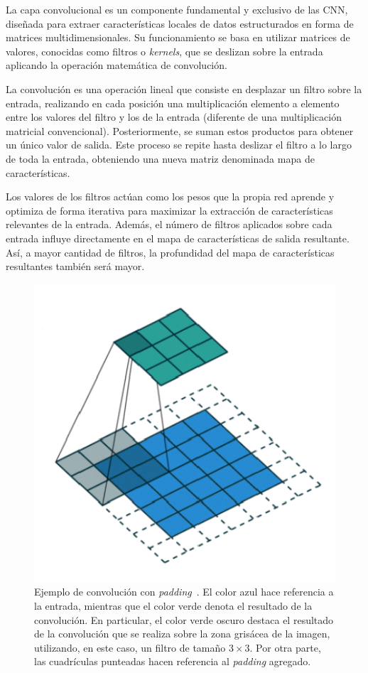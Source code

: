 La capa convolucional es un componente fundamental y exclusivo de las CNN, diseñada para extraer características locales de datos estructurados en forma de matrices multidimensionales. Su funcionamiento se basa en utilizar matrices de valores, conocidas como filtros o \emph{kernels}, que se deslizan sobre la entrada aplicando la operación matemática de convolución.

La convolución es una operación lineal que consiste en desplazar un filtro sobre la entrada, realizando en cada posición una multiplicación elemento a elemento entre los valores del filtro y los de la entrada (diferente de una multiplicación matricial convencional). Posteriormente, se suman estos productos para obtener un único valor de salida. Este proceso se repite hasta deslizar el filtro a lo largo de toda la entrada, obteniendo una nueva matriz denominada mapa de características.

Los valores de los filtros actúan como los pesos que la propia red aprende y optimiza de forma iterativa para maximizar la extracción de características relevantes de la entrada. Además, el número de filtros aplicados sobre cada entrada influye directamente en el mapa de características de salida resultante. Así, a mayor cantidad de filtros, la profundidad del mapa de características resultantes también será mayor.

\begin{figure}[h]
    \centering
    \includegraphics[width=0.5\linewidth]{img/convolucion.png}
    \caption[Ejemplo de convolución con \textit{padding}~\cite{Saha2018}.]{Ejemplo de convolución con \textit{padding}~\cite{Saha2018}. El color azul hace referencia a la entrada, mientras que el color verde denota el resultado de la convolución. En particular, el color verde oscuro destaca el resultado de la convolución que se realiza sobre la zona grisácea de la imagen, utilizando, en este caso, un filtro de tamaño $3 \times 3$. Por otra parte, las cuadrículas punteadas hacen referencia al \textit{padding} agregado.}\label{fig:convolucion}
\end{figure}

